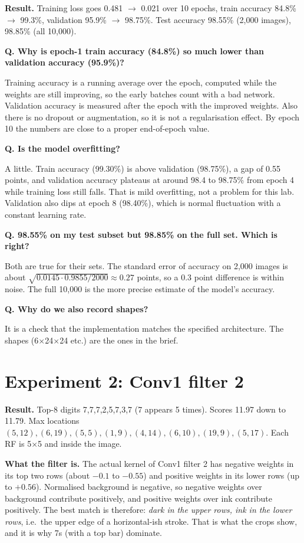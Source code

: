 \documentclass[11pt]{article}
\newcommand{\Q}[1]{\par\vspace{4pt}\noindent\textcolor{qcol}{\textbf{Q. #1}}\par\nopagebreak}
\newcommand{\A}[1]{\noindent #1\par}
\begin{document}
\textbf{Result.} Training loss goes 0.481 $\to$ 0.021 over 10 epochs, train accuracy 84.8\% $\to$ 99.3\%, validation 95.9\% $\to$ 98.75\%. Test accuracy 98.55\% (2,000 images), 98.85\% (all 10,000).

\Q{Why is epoch-1 train accuracy (84.8\%) so much lower than validation accuracy (95.9\%)?}
\A{Training accuracy is a running average over the epoch, computed while the weights are still improving, so the early batches count with a bad network. Validation accuracy is measured after the epoch with the improved weights. Also there is no dropout or augmentation, so it is not a regularisation effect. By epoch 10 the numbers are close to a proper end-of-epoch value.}

\Q{Is the model overfitting?}
\A{A little. Train accuracy (99.30\%) is above validation (98.75\%), a gap of 0.55 points, and validation accuracy plateaus at around 98.4 to 98.75\% from epoch 4 while training loss still falls. That is mild overfitting, not a problem for this lab. Validation also dips at epoch 8 (98.40\%), which is normal fluctuation with a constant learning rate.}

\Q{98.55\% on my test subset but 98.85\% on the full set. Which is right?}
\A{Both are true for their sets. The standard error of accuracy on 2,000 images is about $\sqrt{0.0145\cdot0.9855/2000}\approx0.27$ points, so a 0.3 point difference is within noise. The full 10,000 is the more precise estimate of the model's accuracy.}

\Q{Why do we also record shapes?}
\A{It is a check that the implementation matches the specified architecture. The shapes (6$\times$24$\times$24 etc.) are the ones in the brief.}

\section{Experiment 2: Conv1 filter 2}

\textbf{Result.} Top-8 digits 7,7,7,2,5,7,3,7 (7 appears 5 times). Scores 11.97 down to 11.79. Max locations $(5,12),(6,19),(5,5),(1,9),(4,14),(6,10),(19,9),(5,17)$. Each RF is 5$\times$5 and inside the image.

\textbf{What the filter is.} The actual kernel of Conv1 filter 2 has negative weights in its top two rows (about $-0.1$ to $-0.55$) and positive weights in its lower rows (up to $+0.56$). Normalised background is negative, so negative weights over background contribute positively, and positive weights over ink contribute positively. The best match is therefore: \emph{dark in the upper rows, ink in the lower rows}, i.e.\ the upper edge of a horizontal-ish stroke. That is what the crops show, and it is why 7s (with a top bar) dominate.
\end{document}
